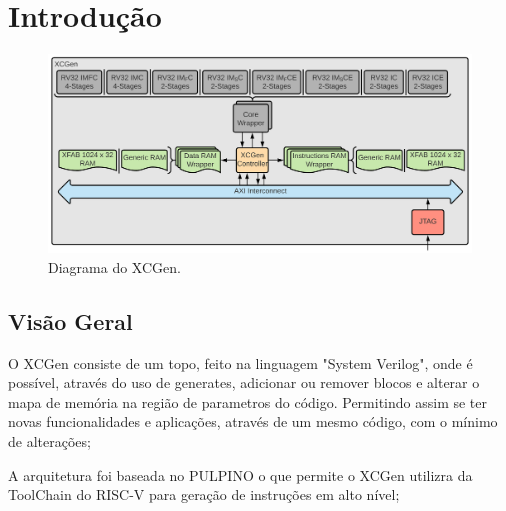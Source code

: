 \section{Introdução} %
\label{sec:introdução}

\begin{figure}[!htb]
  \includegraphics[width=\linewidth]{diagrams/XCGen2.png}
  \caption{Diagrama do XCGen.}
  \label{fig:top}
\end{figure}

\subsection{Visão Geral}
\label{sec:vgeral}
\par O XCGen consiste de um topo, feito na linguagem "System Verilog", onde é possível, através do uso de generates, adicionar ou remover blocos e alterar o mapa de memória na região de parametros do código.
Permitindo assim se ter novas funcionalidades e aplicações, através de um mesmo código, com o mínimo de alterações;
 \\
\par A arquitetura foi baseada no PULPINO o que permite o XCGen utilizra da ToolChain do RISC-V para geração de instruções em alto nível;


